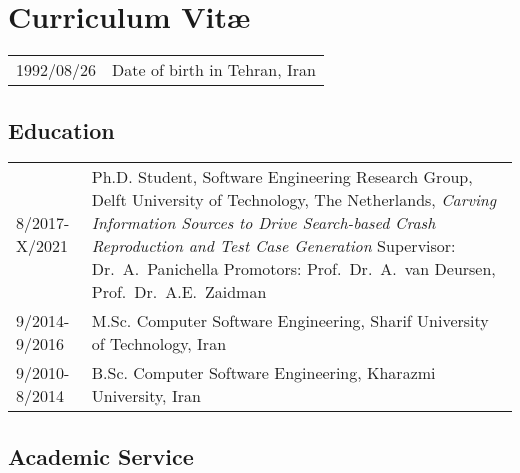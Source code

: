 \chapter*{Curriculum Vit\ae}

\makeatletter
\authors{\@firstname\ {\titleshape\@lastname}}
\makeatother

\noindent
\begin{longtable}{p{} p{}}
    1992/08/26 & Date of birth in Tehran, Iran
\end{longtable}


\section*{Education}
\begin{longtable}{p{} p{}}
    8/2017-X/2021 & Ph.D. Student, Software Engineering Research Group, \newline
    Delft University of Technology, The Netherlands, \newline
    \textit{Carving Information Sources to Drive Search-based Crash Reproduction and Test Case Generation} \newline
    Supervisor: Dr.\ A.\ Panichella \newline
    Promotors: Prof.\ Dr.\ A.\ van Deursen, Prof.\ Dr.\ A.E.\ Zaidman \\
    9/2014-9/2016 & M.Sc. Computer Software Engineering, Sharif University of Technology, Iran \\
    9/2010-8/2014 & B.Sc. Computer Software Engineering, Kharazmi University, Iran
\end{longtable}

\section*{Academic Service}

